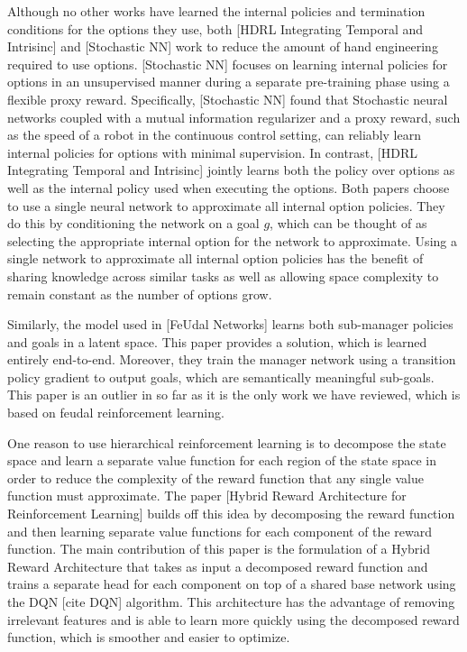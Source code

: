 Although no other works have learned the internal policies and termination conditions
for the options they use, both [HDRL Integrating Temporal and Intrisinc] and
[Stochastic NN] work to reduce the amount of hand engineering required
to use options. [Stochastic NN] focuses on learning internal policies for options in an unsupervised manner
during a separate pre-training phase using a flexible proxy reward.
Specifically, [Stochastic NN] found that Stochastic neural networks coupled with
a mutual information regularizer and a proxy reward, such as the speed of a
robot in the continuous control setting, can reliably learn internal policies for
options with minimal supervision. In contrast,
[HDRL Integrating Temporal and Intrisinc] jointly learns both the policy over options
as well as the internal policy used when executing the options. Both papers choose to
use a single neural network to approximate all internal option policies. They do this
by conditioning the network on a goal $g$, which can be thought of as selecting the
appropriate internal option for the network to approximate. Using a single network
to approximate all internal option policies has the benefit of sharing knowledge
across similar tasks as well as allowing space complexity to remain constant as
the number of options grow.

Similarly, the model used in [FeUdal Networks] learns both sub-manager policies and
goals in a latent space. This paper provides a solution, which is learned entirely
end-to-end. Moreover, they train the manager network using a transition
policy gradient to output goals, which are semantically meaningful sub-goals.
This paper is an outlier in so far as it is the only work we have
reviewed, which is based on feudal reinforcement learning.

One reason to use hierarchical reinforcement learning is
to decompose the state space and learn a separate value function
for each region of the state space in order to reduce the complexity of the reward
function that any single value function must approximate. The paper
[Hybrid Reward Architecture for Reinforcement Learning] builds off this idea
by decomposing the reward function and then learning separate value functions for
each component of the reward function. The main contribution of this paper is
the formulation of a Hybrid Reward Architecture that takes as input a decomposed
reward function and trains a separate head for each component on top of a shared base
network using the DQN [cite DQN] algorithm. This architecture has the advantage of
removing irrelevant features and is able to learn more quickly using the decomposed
reward function, which is smoother and easier to optimize.

